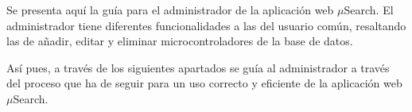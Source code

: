 Se presenta aquí la guía para el administrador de la aplicación web $\mu$Search. El administrador tiene diferentes funcionalidades a las del usuario común, resaltando las de añadir, editar y eliminar microcontroladores de la base de datos.

Así pues, a través de los siguientes apartados se guía al administrador a través del proceso que ha de seguir para un uso correcto y eficiente de la aplicación web $\mu$Search.